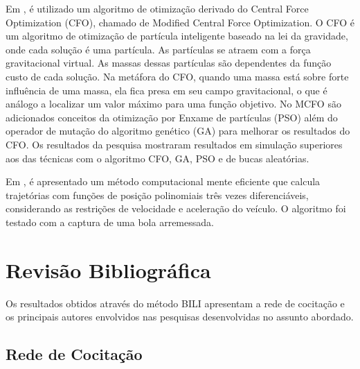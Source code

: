 Em \cite{chen2016modified} , é utilizado um algoritmo de otimização derivado do Central Force Optimization (CFO), chamado de Modified Central Force Optimization. O CFO é um algoritmo de otimização de partícula inteligente baseado na lei da gravidade, onde cada solução é uma partícula. As partículas se atraem com a força gravitacional virtual. As massas dessas partículas são dependentes da função custo de cada solução. Na metáfora do CFO, quando uma massa está sobre forte influência de uma massa, ela fica presa em seu campo gravitacional, o que é análogo a localizar um valor máximo para uma função objetivo.
No MCFO são adicionados conceitos da otimização por Enxame de partículas (PSO) além do operador de mutação do algoritmo genético (GA) para melhorar os resultados do CFO. Os resultados da pesquisa mostraram resultados em simulação superiores aos das técnicas com o algoritmo CFO, GA, PSO e de bucas aleatórias.

Em \cite{Mueller2015a}, é apresentado um método computacional mente eficiente que calcula trajetórias com funções de posição polinomiais três vezes diferenciáveis, considerando as restrições de velocidade e aceleração do veículo. O algoritmo foi testado com a captura de uma bola arremessada.
 

\section{Revisão Bibliográfica}

Os resultados obtidos através do método BILI apresentam a rede de cocitação e os principais autores envolvidos nas pesquisas desenvolvidas no assunto abordado.

\subsection{Rede de Cocitação}

